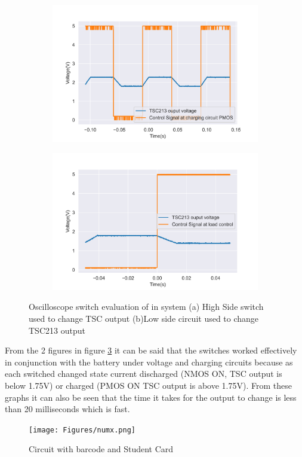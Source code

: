 \begin{figure}[!htb]
	\footnotesize
	\centering
	\begin{subfigure}[]{0.48\textwidth}
		\centering
		\includegraphics[width=1\linewidth]{./Figures/chargePMOSmeas}
		\caption{} \label{subfig:risePMOS}
	\end{subfigure}
	\begin{subfigure}[]{0.48\textwidth}
		\centering
		\includegraphics[width=1\linewidth]{./Figures/NMOSTSCmeas}
		\caption{ } \label{subfig:riseNMOS}
	\end{subfigure}
	\caption[{Rise Time for different switches }]{Oscilloscope switch evaluation of in system  (a)  High Side switch used to change TSC output  (b)Low side circuit used to change TSC213 output }
	\label{fig:rise}
\end{figure}

From the 2 figures in figure \ref{fig:rise} it can be said that the switches worked effectively in conjunction with the battery under voltage and charging circuits because as each switched changed state current discharged (NMOS ON, TSC output is below 1.75V) or charged (PMOS ON TSC output is above 1.75V). From these graphs it can also be seen that the time it takes for the output to change is less than 20 milliseconds which is fast.


\begin{figure}[!htb]
	\centering
	\texttt{[image: Figures/numx.png]}
	\caption{Circuit with barcode and Student Card}
	\label{fig:required}
\end{figure}